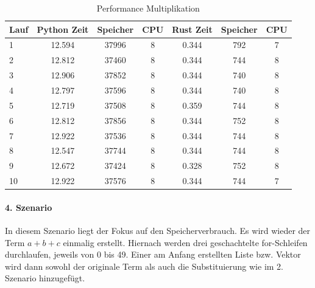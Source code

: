\documentclass[11pt,a4paper, ngerman]{article}
\begin{document}
\begin{table}[h!]
    \caption{Performance Multiplikation}
    \centering
    \begin{tabular}{|l|c|c|c|c|c|c|}
        \hline
        \textbf{Lauf} & \textbf{Python Zeit} & \textbf{Speicher} & \textbf{CPU} & \textbf{Rust Zeit} & \textbf{Speicher} & \textbf{CPU} \\
        \hline
        1 & 12.594 & 37996 & 8 & 0.344 & 792 & 7 \\
        \hline
        2 & 12.812 & 37460 & 8 & 0.344 & 744 & 8 \\
        \hline
        3 & 12.906 & 37852 & 8 & 0.344 & 740 & 8 \\
        \hline
        4 & 12.797 & 37596 & 8 & 0.344 & 740 & 8 \\
        \hline
        5 & 12.719 & 37508 & 8 & 0.359 & 744 & 8 \\
        \hline
        6 & 12.812 & 37856 & 8 & 0.344 & 752 & 8 \\
        \hline
        7 & 12.922 & 37536 & 8 & 0.344 & 744 & 8 \\
        \hline
        8 & 12.547 & 37744 & 8 & 0.344 & 744 & 8 \\
        \hline
        9 & 12.672 & 37424 & 8 & 0.328 & 752 & 8 \\
        \hline
        10 & 12.922 & 37576 & 8 & 0.344 & 744 & 7 \\
        \hline
    \end{tabular}
\end{table}

\paragraph{4. Szenario} In diesem Szenario liegt der Fokus auf den Speicherverbrauch. Es wird wieder der Term $a+b+c$ einmalig erstellt. Hiernach werden drei geschachtelte for-Schleifen durchlaufen, jeweils von 0 bis 49. Einer am Anfang erstellten Liste bzw. Vektor wird dann sowohl der originale Term als auch die Substituierung wie im 2. Szenario hinzugefügt.
\end{document}
